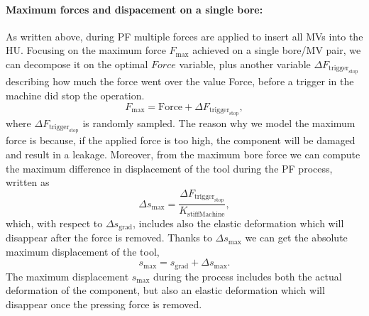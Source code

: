 \paragraph{Maximum forces and dispacement on a single bore:}
As written above, during PF multiple forces are applied to insert all MVs into the HU. Focusing on the maximum force $F_{\text{max}}$ achieved on a single bore/MV pair, we can decompose it on the optimal $Force$ variable, plus another variable $\Delta F_{\text{trigger}_{\text{stop}}}$ describing how much the force went over the value Force, before a trigger in the machine did stop the operation.
\begin{equation}
    F_{\text{max}} = \text{Force} + \Delta F_{\text{trigger}_{\text{stop}}},
\end{equation}
where $\Delta F_{\text{trigger}_{\text{stop}}}$ is randomly sampled. 
The reason why we model the maximum force is because, if the applied force is too high, the component will be damaged and result in a leakage.
Moreover, from the maximum bore force we can compute the maximum difference in displacement of the tool during the PF process, written as
\begin{equation}
    \Delta s_{\text{max}} = \frac{\Delta F_{\text{trigger}_{\text{stop}}}}{K_{\text{stiffMachine}}},
\end{equation}
which, with respect to $\Delta s_{\text{grad}}$, includes also the elastic deformation which will disappear after the force is removed. Thanks to $\Delta s_{\text{max}}$ we can get the absolute maximum displacement of the tool,
\begin{equation}
    s_{\text{max}} = s_{\text{grad}} + \Delta s_{\text{max}}.
\end{equation}
The maximum displacement $s_{\text{max}}$ during the process includes both the actual deformation of the component, but also an elastic deformation which will disappear once the pressing force is removed.

